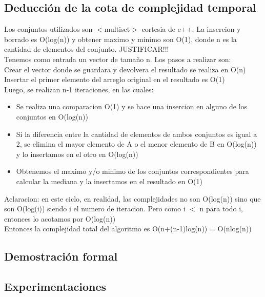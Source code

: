 \subsection{Deducción de la cota de complejidad temporal}
Los conjuntos utilizados son $<$multiset$>$ cortesia de c++. La insercion y borrado es O(log(n)) y obtener maximo y minimo son O(1), donde n es la cantidad de elementos del conjunto. JUSTIFICAR!!! \\
Tenemos como entrada un vector de tamaño n. Los pasos a realizar son: \\
Crear el vector donde se guardara y devolvera el resultado se realiza en O(n) \\
Insertar el primer elemento del arreglo original en el resultado es O(1) \\
Luego, se realizan n-1 iteraciones, en las cuales:
\begin{itemize}
\item Se realiza una comparacion O(1) y se hace una insercion en alguno de los conjuntos en O(log(n))
\item Si la diferencia entre la cantidad de elementos de ambos conjuntos es igual a 2, se elimina el mayor elemento de A o el menor elemento de B en O(log(n)) y lo insertamos en el otro en O(log(n))
\item Obtenemos el maximo y/o minimo de los conjuntos correspondientes para calcular la mediana y la insertamos en el resultado en O(1)
\end{itemize}
Aclaracion: en este ciclo, en realidad, las complejidades no son O(log(n)) sino que son O(log(i)) siendo i el numero de iteracion. Pero como i $<$ n para todo i, entonces lo acotamos por O(log(n)) \\
Entonces la complejidad total del algoritmo es O(n+(n-1)log(n)) = O(nlog(n))
\subsection{Demostración formal}
\subsection{Experimentaciones}



